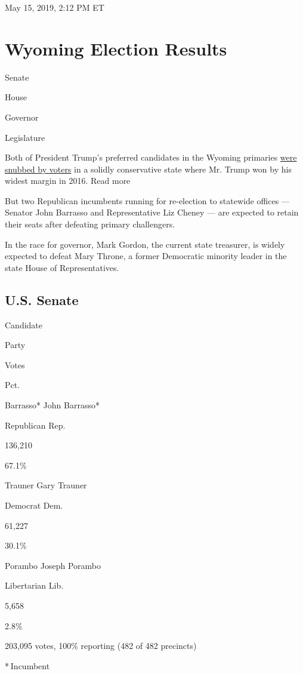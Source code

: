 May 15, 2019, 2:12 PM ET

\hypertarget{wyoming-election-results}{%
\section{Wyoming Election Results}\label{wyoming-election-results}}

Senate

House

Governor

Legislature

Both of President Trump's preferred candidates in the Wyoming primaries
\href{https://www.nytimes3xbfgragh.onion/2018/08/21/us/politics/wyoming-alaska-primaries.html}{were
snubbed by voters} in a solidly conservative state where Mr. Trump won
by his widest margin in 2016. Read more

But two Republican incumbents running for re-election to statewide
offices --- Senator John Barrasso and Representative Liz Cheney --- are
expected to retain their seats after defeating primary challengers.

In the race for governor, Mark Gordon, the current state treasurer, is
widely expected to defeat Mary Throne, a former Democratic minority
leader in the state House of Representatives.

\hypertarget{us-senate}{%
\subsection{U.S. Senate}\label{us-senate}}

Candidate

Party

Votes

Pct.

 Barrasso* John Barrasso*

Republican Rep.

136,210

67.1\%

 Trauner Gary Trauner

Democrat Dem.

61,227

30.1\%

 Porambo Joseph Porambo

Libertarian Lib.

5,658

2.8\%

203,095 votes, 100\% reporting (482 of 482 precincts)

* Incumbent

